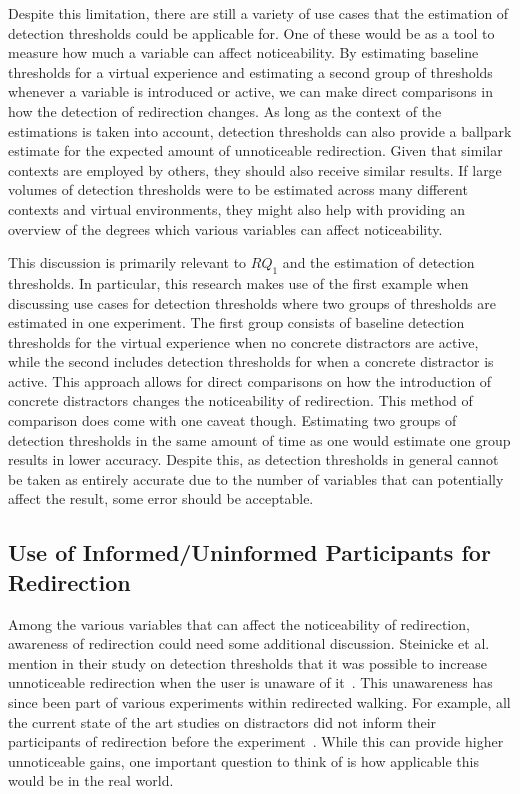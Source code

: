 Despite this limitation, there are still a variety of use cases that the estimation of detection thresholds could be applicable for. One of these would be as a tool to measure how much a variable can affect noticeability. By estimating baseline thresholds for a virtual experience and estimating a second group of thresholds whenever a variable is introduced or active, we can make direct comparisons in how the detection of redirection changes. As long as the context of the estimations is taken into account, detection thresholds can also provide a ballpark estimate for the expected amount of unnoticeable redirection. Given that similar contexts are employed by others, they should also receive similar results. If large volumes of detection thresholds were to be estimated across many different contexts and virtual environments, they might also help with providing an overview of the degrees which various variables can affect noticeability. 

This discussion is primarily relevant to $RQ_1$ and the estimation of detection thresholds. In particular, this research makes use of the first example when discussing use cases for detection thresholds where two groups of thresholds are estimated in one experiment. The first group consists of baseline detection thresholds for the virtual experience when no concrete distractors are active, while the second includes detection thresholds for when a concrete distractor is active. This approach allows for direct comparisons on how the introduction of concrete distractors changes the noticeability of redirection. This method of comparison does come with one caveat though. Estimating two groups of detection thresholds in the same amount of time as one would estimate one group results in lower accuracy. Despite this, as detection thresholds in general cannot be taken as entirely accurate due to the number of variables that can potentially affect the result, some error should be acceptable. 

\subsection{Use of Informed/Uninformed Participants for Redirection}
Among the various variables that can affect the noticeability of redirection, awareness of redirection could need some additional discussion. Steinicke et al. mention in their study on detection thresholds that it was possible to increase unnoticeable redirection when the user is unaware of it~\cite{5072212}. This unawareness has since been part of various experiments within redirected walking. For example, all the current state of the art studies on distractors did not inform their participants of redirection before the experiment~\cite{sra2018vmotion, chen2017towards, chen2017supporting}. While this can provide higher unnoticeable gains, one important question to think of is how applicable this would be in the real world. 

